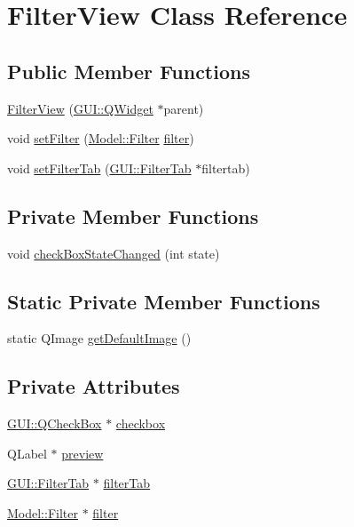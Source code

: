 \hypertarget{classGUI_1_1FilterView}{}\section{Filter\+View Class Reference}
\label{classGUI_1_1FilterView}
\subsection*{Public Member Functions}
\begin{DoxyCompactItemize}
\item 
\hyperlink{classGUI_1_1FilterView_a6994f5827cdc07911e099975f67044df}{Filter\+View} (\hyperlink{classGUI_1_1QWidget}{G\+U\+I\+::\+Q\+Widget} $\ast$parent)
\item 
void \hyperlink{classGUI_1_1FilterView_a701b7d9f632d1a26c34b5a13eb75249e}{set\+Filter} (\hyperlink{classModel_1_1Filter}{Model\+::\+Filter} \hyperlink{classGUI_1_1FilterView_a573678d67a3af0d81b06a4bb3a88957e}{filter})
\item 
void \hyperlink{classGUI_1_1FilterView_a8732f98917f4cf76c86e9c4d6df1ce70}{set\+Filter\+Tab} (\hyperlink{classGUI_1_1FilterTab}{G\+U\+I\+::\+Filter\+Tab} $\ast$filtertab)
\end{DoxyCompactItemize}
\subsection*{Private Member Functions}
\begin{DoxyCompactItemize}
\item 
void \hyperlink{classGUI_1_1FilterView_a2df842907a528c0743d099b52b28f656}{check\+Box\+State\+Changed} (int state)
\end{DoxyCompactItemize}
\subsection*{Static Private Member Functions}
\begin{DoxyCompactItemize}
\item 
static Q\+Image \hyperlink{classGUI_1_1FilterView_aa321fa9d813df1f89a5fefe4723baf2d}{get\+Default\+Image} ()
\end{DoxyCompactItemize}
\subsection*{Private Attributes}
\begin{DoxyCompactItemize}
\item 
\hyperlink{classGUI_1_1QCheckBox}{G\+U\+I\+::\+Q\+Check\+Box} $\ast$ \hyperlink{classGUI_1_1FilterView_a3596dc6ca96995c950cf1929a3d7f662}{checkbox}
\item 
Q\+Label $\ast$ \hyperlink{classGUI_1_1FilterView_a04293c681f4f8e169e69d7971ab28866}{preview}
\item 
\hyperlink{classGUI_1_1FilterTab}{G\+U\+I\+::\+Filter\+Tab} $\ast$ \hyperlink{classGUI_1_1FilterView_a47ca82534a740774d79998759818d9f4}{filter\+Tab}
\item 
\hyperlink{classModel_1_1Filter}{Model\+::\+Filter} $\ast$ \hyperlink{classGUI_1_1FilterView_a573678d67a3af0d81b06a4bb3a88957e}{filter}
\end{DoxyCompactItemize}


